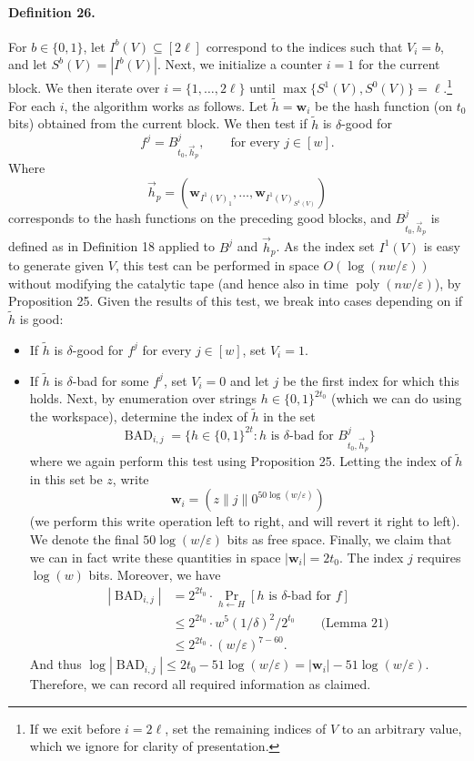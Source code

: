 \documentclass[10pt,a4paper]{article}
\begin{document}
\paragraph{Definition 26.} For $b\in\{0,1\}$, let $I^b(V)\subseteq[2\ell]$ correspond to the indices such that $V_i=b$, and let $S^b(V)=|I^b(V)|$.
Next, we initialize a counter $i=1$ for the current block. We then iterate over $i=\{1,\ldots,2\ell\}$ until $\max\{S^1(V),S^0(V)\}=\ell$.\footnote{If we exit before $i=2\ell$, set the remaining indices of $V$ to an arbitrary value, which we ignore for clarity of presentation.} For each $i$, the algorithm works as follows. Let $\widetilde h=\mathbf w_i$ be the hash function (on $t_0$ bits) obtained from the current block. We then test if $\widetilde h$ is $\delta$-good for
\[f^j=B^j_{t_0,\vec h_p},\qquad\text{for every }j\in[w].\]
Where
\[\vec h_p=(\mathbf w_{I^1(V)_1},\ldots,\mathbf w_{I^1(V)_{S^1(V)}})\]
corresponds to the hash functions on the preceding good blocks, and $B^j_{t_0,\vec h_p}$ is defined as in Definition 18 applied to $B^j$ and $\vec h_p$. As the index set $I^1(V)$ is easy to generate given $V$, this test can be performed in space $O(\log(nw/\varepsilon))$ without modifying the catalytic tape (and hence also in time $\operatorname{poly}(nw/\varepsilon)$), by Proposition 25.
Given the results of this test, we break into cases depending on if $\widetilde h$ is good:
\begin{itemize}
\item If $\widetilde h$ is $\delta$-good for $f^j$ for every $j\in[w]$, set $V_i=1$.
\item If $\widetilde h$ is $\delta$-bad for some $f^j$, set $V_i=0$ and let $j$ be the first index for which this holds. Next, by enumeration over strings $h\in\{0,1\}^{2t_0}$ (which we can do using the workspace), determine the index of $\widetilde h$ in the set
\[\operatorname{BAD}_{i,j}=\{h\in\{0,1\}^{2t}:h\text{ is }\delta\text{-bad for }B^j_{t_0,\vec h_p}\}\]
where we again perform this test using Proposition 25. Letting the index of $\widetilde h$ in this set be $z$, write
\[\mathbf w_i=(z\|j\|0^{50\log(w/\varepsilon)})\]
(we perform this write operation left to right, and will revert it right to left). We denote the final $50\log(w/\varepsilon)$ bits as free space.
Finally, we claim that we can in fact write these quantities in space $|\mathbf w_i|=2t_0$. The index $j$ requires $\log(w)$ bits. Moreover, we have
\begin{align*}
|\operatorname{BAD}_{i,j}|&=2^{2t_0}\cdot\Pr_{h\leftarrow H}[h\text{ is }\delta\text{-bad for }f]\\
&\leq2^{2t_0}\cdot w^5(1/\delta)^2/2^{t_0}\qquad\text{(Lemma 21)}\\
&\leq2^{2t_0}\cdot(w/\varepsilon)^{7-60}.
\end{align*}
And thus $\log|\operatorname{BAD}_{i,j}|\leq2t_0-51\log(w/\varepsilon)=|\mathbf w_i|-51\log(w/\varepsilon)$. Therefore, we can record all required information as claimed.
\end{itemize}
\end{document}
